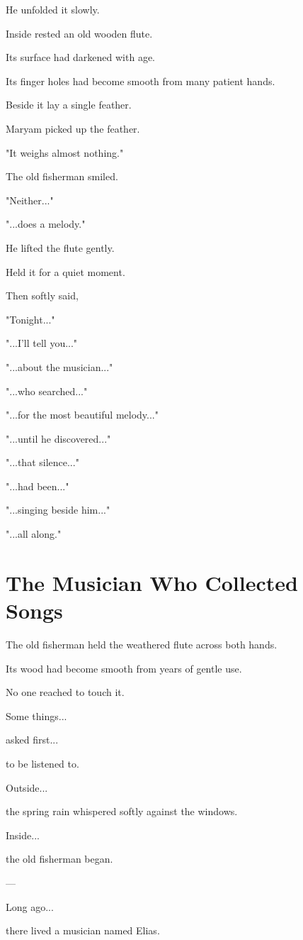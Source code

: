 \documentclass[12pt,openany]{book}
\begin{document}
He unfolded it slowly.

Inside rested an old wooden flute.

Its surface had darkened with age.

Its finger holes had become smooth from many patient hands.

Beside it lay a single feather.

Maryam picked up the feather.

"It weighs almost nothing."

The old fisherman smiled.

"Neither..."

"...does a melody."

He lifted the flute gently.

Held it for a quiet moment.

Then softly said,

"Tonight..."

"...I'll tell you..."

"...about the musician..."

"...who searched..."

"...for the most beautiful melody..."

"...until he discovered..."

"...that silence..."

"...had been..."

"...singing beside him..."

"...all along."
\section*{The Musician Who Collected Songs}

The old fisherman held the weathered flute across both hands.

Its wood had become smooth from years of gentle use.

No one reached to touch it.

Some things...

asked first...

to be listened to.

Outside...

the spring rain whispered softly against the windows.

Inside...

the old fisherman began.

---

Long ago...

there lived a musician named Elias.
\end{document}
